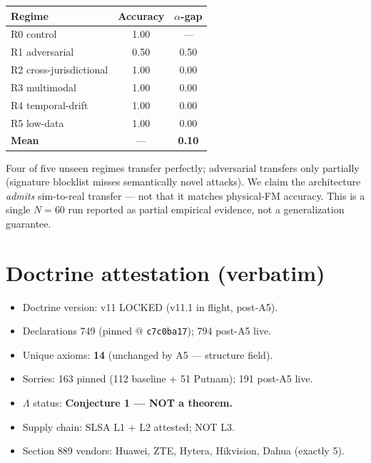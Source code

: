 \documentclass[11pt]{article}
\newcommand{\Lam}{\ensuremath{\Lambda}}
\begin{document}
\begin{center}\small
\begin{tabular}{@{}lcc@{}}
\toprule
Regime & Accuracy & $\alpha$-gap \\
\midrule
R0 control & 1.00 & --- \\
R1 adversarial & 0.50 & 0.50 \\
R2 cross-jurisdictional & 1.00 & 0.00 \\
R3 multimodal & 1.00 & 0.00 \\
R4 temporal-drift & 1.00 & 0.00 \\
R5 low-data & 1.00 & 0.00 \\
\midrule
\textbf{Mean} & --- & \textbf{0.10} \\
\bottomrule
\end{tabular}
\end{center}

\noindent Four of five unseen regimes transfer perfectly; adversarial transfers only partially (signature
blocklist misses semantically novel attacks). We claim the architecture \emph{admits} sim-to-real
transfer --- not that it matches physical-FM accuracy. This is a single $N{=}60$ run reported as
partial empirical evidence, not a generalization guarantee.

\section{Doctrine attestation (verbatim)}
\begin{itemize}\setlength\itemsep{0pt}
  \item Doctrine version: v11 LOCKED (v11.1 in flight, post-A5).
  \item Declarations 749 (pinned @ \texttt{c7c0ba17}); 794 post-A5 live.
  \item Unique axioms: \textbf{14} (unchanged by A5 --- structure field).
  \item Sorries: 163 pinned (112 baseline + 51 Putnam); 191 post-A5 live.
  \item \Lam{} status: \textbf{Conjecture 1 --- NOT a theorem.}
  \item Supply chain: SLSA L1 + L2 attested; NOT L3.
  \item Section 889 vendors: Huawei, ZTE, Hytera, Hikvision, Dahua (exactly 5).
\end{itemize}
\end{document}
